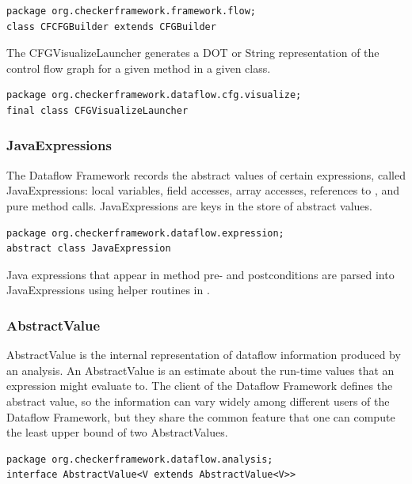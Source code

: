 \begin{verbatim}
package org.checkerframework.framework.flow;
class CFCFGBuilder extends CFGBuilder
\end{verbatim}

\label{sec:cfg_visualize_launcher_class}

The CFGVisualizeLauncher generates a DOT or String representation of
the control flow graph for a given method in a given class.

\begin{verbatim}
package org.checkerframework.dataflow.cfg.visualize;
final class CFGVisualizeLauncher
\end{verbatim}

\subsubsection{JavaExpressions}
\label{sec:flow_expressions_class}

The Dataflow Framework records the abstract values of certain
expressions, called JavaExpressions: local variables, field accesses,
array accesses, references to , and pure method calls.
JavaExpressions are keys in the store of abstract values.

\begin{verbatim}
package org.checkerframework.dataflow.expression;
abstract class JavaExpression
\end{verbatim}

Java expressions that appear in method pre- and postconditions are
parsed into JavaExpressions using helper routines in
.


\subsubsection{AbstractValue}
\label{sec:abstract_value_classes}

AbstractValue is the internal representation of dataflow information
produced by an analysis.  An AbstractValue is an estimate about the
run-time values that an expression might evaluate to.  The client of the
Dataflow Framework defines the abstract value, so the information can
vary widely among different users of the Dataflow Framework, but they
share the common feature that one can compute the least upper bound of
two AbstractValues.

\begin{verbatim}
package org.checkerframework.dataflow.analysis;
interface AbstractValue<V extends AbstractValue<V>>
\end{verbatim}

